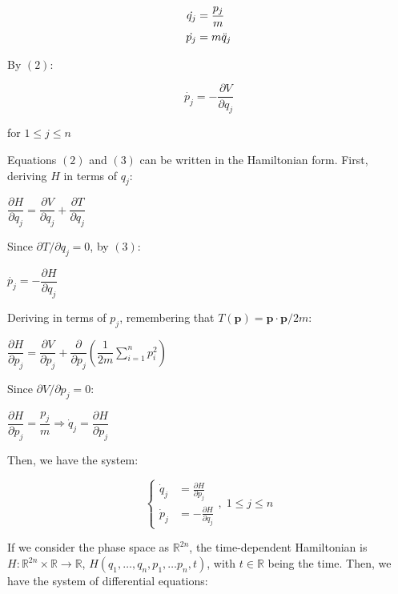 \documentclass[a4paper,12pt] {article}
\begin{document}
\begin{align}
    \dot{q_j} &= \frac{p_j}{m} \notag \\
    \dot{p_j} &= m\ddot{q}_j
\end{align}

 By $(2)$:

\begin{equation}
    \dot{p_j} = -\dfrac{\partial V}{\partial q_j}
\end{equation}

\noindent for $1 \leq j \leq n$

 Equations $(2)$ and $(3)$ can be written in the Hamiltonian form. First, deriving $H$ in terms of $q_j$:

\begin{center}
    $\dfrac{\partial H}{\partial q_j} = \dfrac{\partial V}{\partial q_j} + \dfrac{\partial T}{\partial q_j}$
\end{center}

 Since $\partial T/\partial q_j = 0$, by $(3)$:

\begin{center}
    $\dot{p_j} = -\dfrac{\partial H}{\partial q_j}$
\end{center}

 Deriving in terms of $p_j$, remembering that $T(\mathbf{p}) = \mathbf{p} \cdot \mathbf{p}/2m$:

\begin{center}
    $\dfrac{\partial H}{\partial p_j} = \dfrac{\partial V}{\partial p_j} + \dfrac{\partial}{\partial p_j} \left(\dfrac{1}{2m}\displaystyle \sum_{i = 1}^n p_i^2\right)$
\end{center}

 Since $\partial V/\partial p_j = 0$:

\begin{center}
    $\dfrac{\partial H}{\partial p_j} = \dfrac{p_j}{m} \Rightarrow \dot{q}_j = \dfrac{\partial H}{\partial p_j}$
\end{center}

 Then, we have the system:

\[
\left\{
\begin{aligned}
\dot{q}_j &= \frac{\partial H}{\partial p_j}\\[2mm]
\dot{p}_j &= -\frac{\partial H}{\partial q_j}
\end{aligned}
\right., \; 1 \le j \le n
\]

 If we consider the phase space as $\mathbb{R}^{2n}$, the time-dependent Hamiltonian is $H : \mathbb{R}^{2n} \times \mathbb{R} \to \mathbb{R}$, $H(q_1,\dots,q_n,p_1,\dots p_n,t)$, with $t \in \mathbb{R}$ being the time. Then, we have the system of differential equations:
\end{document}
